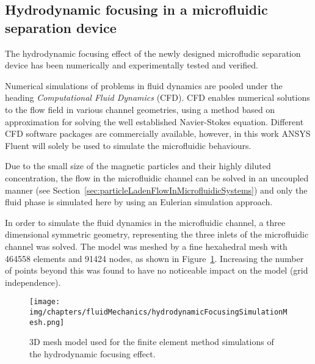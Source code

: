 
\subsection{Hydrodynamic focusing in a microfluidic separation device}\label{sec:hydrodynamicFocusingInAMicrofluidicSeparationDevice}
The hydrodynamic focusing effect of the newly designed microfludic separation device has been numerically and experimentally tested and verified.  

Numerical simulations of problems in fluid dynamics are pooled under the heading \textit{Computational Fluid Dynamics} (CFD). CFD enables numerical solutions to the flow field in various channel geometries, using a method based on approximation for solving the well established Navier-Stokes equation. Different CFD software packages are commercially available, however, in this work ANSYS Fluent will solely be used to simulate the microfluidic behaviours. 

Due to the small size of the magnetic particles and their highly diluted concentration, the flow in the microfluidic channel can be solved in an uncoupled manner (see Section~\ref{sec:particleLadenFlowInMicrofluidicSystems}) and only the fluid phase is simulated here by using an Eulerian simulation approach.

In order to simulate the fluid dynamics in the microfluidic channel, a three dimensional symmetric geometry, representing the three inlets of the microfluidic channel was solved. The model was meshed by a fine hexahedral mesh with 464558 elements and 91424 nodes, as shown in Figure~\ref{fig:hydrodynamicFocusingSimulationMesh}. Increasing the number of points beyond this was found to have no noticeable impact on the model (grid independence).

\begin{figure}[htb]
\centering
   \texttt{[image: img/chapters/fluidMechanics/hydrodynamicFocusingSimulationMesh.png]}
\caption[3D mesh model of microfluidic channel]{3D mesh model used for the finite element method simulations of the hydrodynamic focusing effect.}%
\label{fig:hydrodynamicFocusingSimulationMesh}%
\end{figure} 

